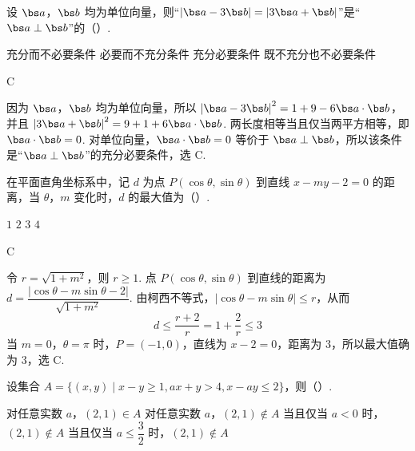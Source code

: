 \begin{problem}
设 \(\bs a\)，\(\bs b\) 均为单位向量，则“\(\left\lvert \bs a-3\bs b\right\rvert=\left\lvert 3\bs a+\bs b\right\rvert\)”是“\(\bs a\perp \bs b\)”的（\quad）.

\choices
    {充分而不必要条件}
    {必要而不充分条件}
    {充分必要条件}
    {既不充分也不必要条件}
\end{problem}

\begin{answer}
C
\end{answer}

\begin{solution}
因为 \(\bs a\)，\(\bs b\) 均为单位向量，所以
\(\left\lvert\bs a-3\bs b\right\rvert^2=1+9-6\bs a\cdot\bs b\)，并且
\(\left\lvert3\bs a+\bs b\right\rvert^2=9+1+6\bs a\cdot\bs b\).
两长度相等当且仅当两平方相等，即 \(\bs a\cdot\bs b=0\). 对单位向量，\(\bs a\cdot\bs b=0\) 等价于 \(\bs a\perp\bs b\)，所以该条件是“\(\bs a\perp\bs b\)”的充分必要条件，选 C.
\end{solution}

\begin{problem}
在平面直角坐标系中，记 \(d\) 为点 \(P(\cos\theta,\sin\theta)\) 到直线 \(x-my-2=0\) 的距离，当 \(\theta\)，\(m\) 变化时，\(d\) 的最大值为（\quad）.

\choices
    {\(1\)}
    {\(2\)}
    {\(3\)}
    {\(4\)}
\end{problem}

\begin{answer}
C
\end{answer}

\begin{solution}
令 \(r=\sqrt{1+m^2}\)，则 \(r\geq1\). 点 \(P(\cos\theta,\sin\theta)\) 到直线的距离为
\(d=\dfrac{\left\lvert\cos\theta-m\sin\theta-2\right\rvert}{\sqrt{1+m^2}}\).
由柯西不等式，\(\left\lvert\cos\theta-m\sin\theta\right\rvert\leq r\)，从而
\[
d\leq\frac{r+2}{r}=1+\frac2r\leq3
\]
当 \(m=0\)，\(\theta=\pi\) 时，\(P=(-1,0)\)，直线为 \(x-2=0\)，距离为 \(3\)，所以最大值确为 \(3\)，选 C.
\end{solution}

\begin{problem}
设集合 \(A=\{(x,y)\mid x-y\ge1,ax+y>4,x-ay\le2\}\)，则（\quad）.

\choices
    {对任意实数 \(a\)，\((2,1)\in A\)}
    {对任意实数 \(a\)，\((2,1)\notin A\)}
    {当且仅当 \(a<0\) 时，\((2,1)\notin A\)}
    {当且仅当 \(a\le \dfrac32\) 时，\((2,1)\notin A\)}
\end{problem}


